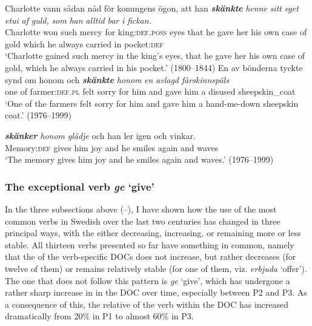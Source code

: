 \documentclass[output=paper]{langscibook}
\begin{document}
\ea \label{ex:valdeson:32}
\gll Charlotte vann sådan  nåd      för    konungens    ögon,    att    han  \textbf{\textit{skänkte}} \textit{henne} \textit{sitt} \textit{eget} \textit{etui}   \textit{af} \textit{guld,} \textit{som} \textit{han} \textit{alltid} \textit{bar} \textit{i} \textit{fickan.} \\
  Charlotte   won such   mercy   for       {king:\textsc{def.poss}} eyes   that he gave       her       his own   case   of   gold which he   always carried  in   {pocket:\textsc{def}}\\
\glt ‘Charlotte gained such mercy in the king’s eyes, that he gave her his own case of gold, which he always carried in his pocket.’ (1800–1844)
\ex \label{ex:valdeson:33}
\ea \gll En     av   bönderna       tyckte   synd   om honom {och} \textbf{\textit{skänkte}} \textit{honom} \textit{en} \textit{avlagd} \textit{fårskinnspäls} \\
      one     of   farmer:\textsc{def}.\textsc{pl} felt       sorry   for   him and gave     him     a     disused     sheepskin\_coat\\   
\glt ‘One of the farmers felt sorry for him and gave him a hand-me-down sheepskin coat.’ (1976–1999)

\ex {} \textbf{\textit{skänker}} \textit{honom} \textit{glädje} {och} {han} {ler} {igen} {och} {vinkar.} \\
        Memory:\textsc{def} gives     him   joy     and he     smiles   again   and   waves\\
\glt ‘The memory gives him joy and he smiles again and waves.’ (1976–1999)
\z
\z


\subsubsection{The exceptional verb \textit{ge} ‘give’}\label{sec:valdeson:5.3.4}

\begin{sloppypar}
In the three subsections above (–), I have shown how the use of the most common  verbs in Swedish over the last two centuries has changed in three principal ways, with the  either decreasing, increasing, or remaining more or less stable. All thirteen verbs presented so far have something in common, namely that the  of the verb-specific DOCs does not increase, but rather decreases (for twelve of them) or remains relatively stable (for one of them, viz. \textit{erbjuda} ‘offer’). The one  that does not follow this pattern is \textit{ge} ‘give’, which has undergone a rather sharp increase in  in the DOC over time, especially between P2 and P3. As a consequence of this, the relative  of the verb within the DOC has increased dramatically from 20\% in P1 to almost 60\% in P3.
\end{sloppypar}
\end{document}
